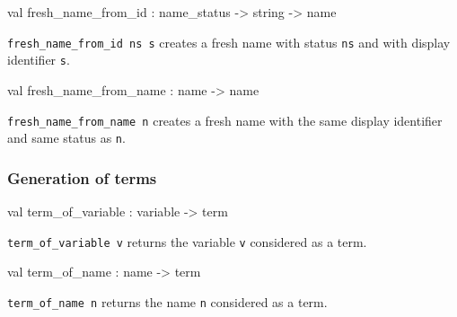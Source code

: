 \label{val:Term.fresh-underscorename-underscorefrom-underscoreid}\begin{ocamldoccode}
val fresh_name_from_id : name_status -> string -> name
\end{ocamldoccode}
\begin{ocamldocdescription}
{\tt{fresh\_name\_from\_id ns s}} creates a fresh name with status {\tt{ns}} and  with display identifier {\tt{s}}.


\end{ocamldocdescription}




\label{val:Term.fresh-underscorename-underscorefrom-underscorename}\begin{ocamldoccode}
val fresh_name_from_name : name -> name
\end{ocamldoccode}
\begin{ocamldocdescription}
{\tt{fresh\_name\_from\_name n}} creates a fresh name with the same display identifier
    and same status as {\tt{n}}.


\end{ocamldocdescription}




\subsubsection{Generation of terms}




\label{val:Term.term-underscoreof-underscorevariable}\begin{ocamldoccode}
val term_of_variable : variable -> term
\end{ocamldoccode}
\begin{ocamldocdescription}
{\tt{term\_of\_variable v}} returns the variable {\tt{v}} considered as a term.


\end{ocamldocdescription}




\label{val:Term.term-underscoreof-underscorename}\begin{ocamldoccode}
val term_of_name : name -> term
\end{ocamldoccode}
\begin{ocamldocdescription}
{\tt{term\_of\_name n}} returns the name {\tt{n}} considered as a term.


\end{ocamldocdescription}




